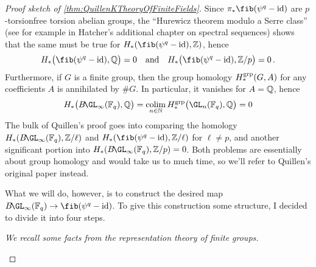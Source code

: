 \begin{proof}[Proof sketch of \cref{thm:QuillenKTheoryOfFiniteFields}]
	Since $\pi_*\fib(\psi^q-\id)$ are $p$-torsionfree torsion abelian groups, the \enquote{Hurewicz theorem modulo a Serre class} (see for example \cite[Theorem~\href{https://pi.math.cornell.edu/~hatcher/AT/ATch5.pdf}{5.7}]{Hatcher} in Hatcher's additional chapter on spectral sequences) shows that the same must be true for $H_*(\fib(\psi^q-\id),\IZ)$, hence
	\begin{equation*}
		H_*\big(\fib(\psi^q-\id),\IQ\big)=0\quad\text{and}\quad H_*\big(\fib(\psi^q-\id),\IZ/p\big)=0\,.
	\end{equation*}
	Furthermore, if $G$ is a finite group, then the group homology $H_*^{\mathrm{grp}}(G,A)$ for any coefficients $A$ is annihilated by $\# G$. In particular, it vanishes for $A=\mathbb{Q}$, hence
	\begin{equation*}
		H_*\big(B\!\GL_\infty(\IF_q),\IQ\big)=\colimit_{n\in\IN}H_*^{\grp}\big(\GL_n(\IF_q),\IQ\big)=0
	\end{equation*}
	The bulk of Quillen's proof goes into comparing the homology $H_*(B\!\GL_\infty(\IF_q),\IZ/\ell)$ and $H_*(\fib(\psi^q-\id),\IZ/\ell)$ for $\ell\neq p$, and another significant portion into $H_*(B\!\GL_\infty(\IF_q),\IZ/p)=0$. Both problems are essentially about group homology and would take us to much time, so we'll refer to Quillen's original paper \cite{QuillenKTheoryOfFiniteFields} instead.
	
	What we will do, however, is to construct the desired map $B\!\GL_\infty(\IF_q)\morphism \fib(\psi^q-\id)$. To give this construction some structure, I decided to divide it into four steps.
	\begin{alphanumerate}
		\item[\itememph{0}] \itshape We recall some facts from the representation theory of finite groups.
	\end{alphanumerate}
	

\end{proof}
